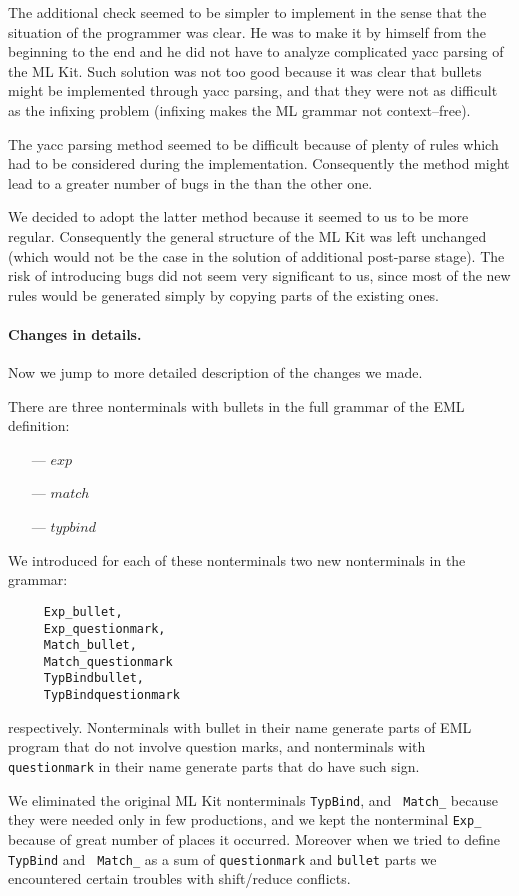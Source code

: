 The additional check seemed to be simpler to implement in the sense
that the situation of the programmer was clear. He was to make it by
himself from the beginning to the end and he did not have to analyze
complicated yacc parsing of the ML Kit. Such solution was not too good
because it was clear that bullets might be implemented through yacc
parsing, and that they were not as difficult as the infixing problem
(infixing makes the ML grammar not context--free).

The yacc parsing method seemed to be difficult because of plenty of
rules which had to be considered during the
implementation. Consequently the method might lead to a greater number
of bugs in the \EMLK than the other one.

We decided to adopt the latter method because it seemed to us to be
more regular. Consequently the general structure of the ML Kit was
left unchanged (which would not be the case in the solution of
additional post-parse stage). The risk of introducing bugs did not
seem very significant to us, since most of the new rules would be
generated simply by copying parts of the existing ones.

\paragraph{Changes in details.} 
Now we jump to more detailed description of the changes we made.

There are three nonterminals with bullets in the full grammar of the
EML definition:
\begin{itemize}
\item[---] $exp$
\item[---] $match$
\item[---] $typbind$
\end{itemize}

We introduced for each of these nonterminals two new nonterminals in
the \EMLK grammar: 
\begin{verbatim}
     Exp_bullet, 
     Exp_questionmark, 
     Match_bullet,
     Match_questionmark
     TypBindbullet, 
     TypBindquestionmark
\end{verbatim}
respectively.  Nonterminals with bullet in their name generate parts
of EML program that do not involve question marks, and nonterminals
with {\tt questionmark} in their name generate parts that do have such
sign.

We eliminated the original ML Kit nonterminals {\tt TypBind}, and {\tt
Match\_} because they were needed only in few productions, and we kept
the nonterminal {\tt Exp\_} because of great number of places it
occurred. Moreover when we tried to define {\tt TypBind} and {\tt
Match\_} as a sum of {\tt questionmark} and {\tt bullet} parts we
encountered certain troubles with shift/reduce conflicts.

